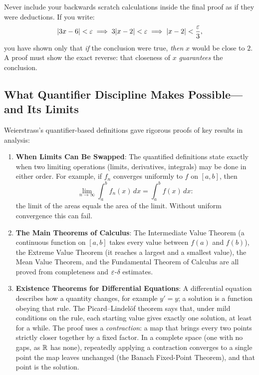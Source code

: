 \begin{trapbox}
Never include your backwards scratch calculations inside the final proof as if they were deductions. If you write:
\[
|3x - 6| < \varepsilon \implies 3|x - 2| < \varepsilon \implies |x - 2| < \frac{\varepsilon}{3},
\]
you have shown only that \emph{if} the conclusion were true, \emph{then} $x$ would be close to $2$. A proof must show the exact reverse: that closeness of $x$ \emph{guarantees} the conclusion.
\end{trapbox}

\subsection{What Quantifier Discipline Makes Possible---and Its Limits}

Weierstrass's quantifier-based definitions gave rigorous proofs of key results in analysis:
\begin{enumerate}
  \item \textbf{When Limits Can Be Swapped}: The quantified definitions state exactly when two limiting operations (limits, derivatives, integrals) may be done in either order. For example, if $f_n$ converges uniformly to $f$ on $[a, b]$, then
  \[
  \lim_{n \to \infty} \int_a^b f_n(x) \, dx = \int_a^b f(x) \, dx:
  \]
  the limit of the areas equals the area of the limit. Without uniform convergence this can fail.
  \item \textbf{The Main Theorems of Calculus}: The Intermediate Value Theorem (a continuous function on $[a, b]$ takes every value between $f(a)$ and $f(b)$), the Extreme Value Theorem (it reaches a largest and a smallest value), the Mean Value Theorem, and the Fundamental Theorem of Calculus are all proved from completeness and $\varepsilon$-$\delta$ estimates.
  \item \textbf{Existence Theorems for Differential Equations}: A differential equation describes how a quantity changes, for example $y' = y$; a solution is a function obeying that rule. The Picard--Lindel\"of theorem says that, under mild conditions on the rule, each starting value gives exactly one solution, at least for a while. The proof uses a \emph{contraction}: a map that brings every two points strictly closer together by a fixed factor. In a complete space (one with no gaps, as $\mathbb{R}$ has none), repeatedly applying a contraction converges to a single point the map leaves unchanged (the Banach Fixed-Point Theorem), and that point is the solution.
\end{enumerate}

